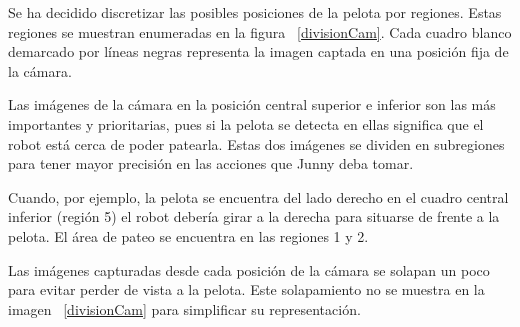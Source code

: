 Se ha decidido discretizar las posibles posiciones de la pelota por regiones. Estas regiones se muestran enumeradas en la figura ~\ref{divisionCam}. Cada cuadro blanco demarcado por líneas negras representa la imagen captada en una posición fija de la cámara. 

Las im\'agenes de la cámara en la posición central superior e inferior son las más importantes y prioritarias, pues si la pelota se detecta en ellas significa que el robot está cerca de poder patearla. Estas dos im\'agenes se dividen en subregiones para tener mayor precisión en las acciones que Junny deba tomar.

Cuando, por ejemplo, la pelota se encuentra del lado derecho en el cuadro central inferior (región 5) el robot debería girar a la derecha para situarse de frente a la pelota. El área de pateo se encuentra en las regiones 1 y 2.

Las imágenes capturadas desde cada posición de la cámara se solapan un poco para evitar perder de vista a la pelota. Este solapamiento no se muestra en la imagen ~\ref{divisionCam} para simplificar su representación.





 

